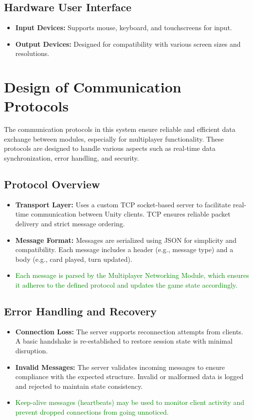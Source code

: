 \documentclass[12pt, titlepage]{article}
\newcommand{\added}[1]{\textcolor{green}{#1}}
\begin{document}
\subsection{Hardware User Interface}
\begin{itemize}
    \item \textbf{Input Devices:} Supports mouse, keyboard, and touchscreens for input.
    \item \textbf{Output Devices:} Designed for compatibility with various screen sizes and resolutions.
\end{itemize}

\section{Design of Communication Protocols}

The communication protocols in this system ensure reliable and efficient data exchange between modules, especially for multiplayer functionality. These protocols are designed to handle various aspects such as real-time data synchronization, error handling, and security.

\subsection{Protocol Overview}
\begin{itemize}
    \item \textbf{Transport Layer:} Uses a custom TCP socket-based server to facilitate real-time communication between Unity clients. TCP ensures reliable packet delivery and strict message ordering.
    \item \textbf{Message Format:} Messages are serialized using JSON for simplicity and compatibility. Each message includes a header (e.g., message type) and a body (e.g., card played, turn updated).
    \item \added{Each message is parsed by the Multiplayer Networking Module, which ensures it adheres to the defined protocol and updates the game state accordingly.}
\end{itemize}

\subsection{Error Handling and Recovery}
\begin{itemize}
    \item \textbf{Connection Loss:} The server supports reconnection attempts from clients. A basic handshake is re-established to restore session state with minimal disruption.
    \item \textbf{Invalid Messages:} The server validates incoming messages to ensure compliance with the expected structure. Invalid or malformed data is logged and rejected to maintain state consistency.
    \item \added{Keep-alive messages (heartbeats) may be used to monitor client activity and prevent dropped connections from going unnoticed.}
\end{itemize}
\end{document}
